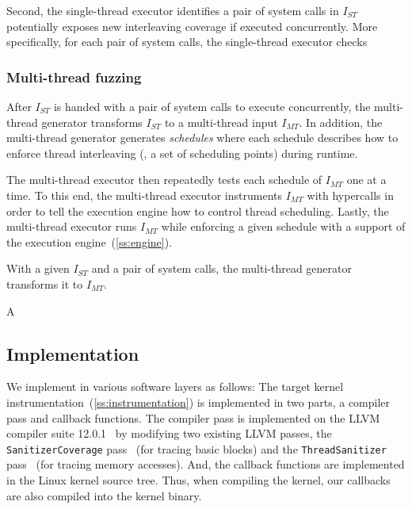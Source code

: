 Second, the single-thread executor identifies a pair of system calls
in $I_{ST}$ potentially exposes new interleaving coverage if executed
concurrently.
%
More specifically, for each pair of system calls, the single-thread
executor checks  \dr{}
%



\subsubsection{Multi-thread fuzzing}
%
After $I_{ST}$ is handed with a pair of system calls to execute
concurrently, the multi-thread generator transforms $I_{ST}$ to a
multi-thread input $I_{MT}$.
%
In addition, the multi-thread generator generates \textit{schedules}
where each schedule describes how to enforce thread interleaving (\ie,
a set of scheduling points) during runtime.


The multi-thread executor then repeatedly tests each schedule of
$I_{MT}$ one at a time.
%
To this end, the multi-thread executor instruments $I_{MT}$ with
hypercalls in order to tell the execution engine how to control thread
scheduling.
%
Lastly, the multi-thread executor runs $I_{MT}$ while enforcing a
given schedule with a support of the execution
engine~(\autoref{ss:engine}).




%





With a given $I_{ST}$ and a pair of system calls, the multi-thread
generator transforms it to $I_{MT}$.




%
A 





\subsection{Implementation}
\label{ss:impl}

We implement \sys in various software layers as follows:
%
The target kernel instrumentation~(\autoref{ss:instrumentation}) is
implemented in two parts, a compiler pass and callback functions. The
compiler pass is implemented on the LLVM compiler suite
12.0.1~\cite{llvm} by modifying two existing LLVM passes, the
\texttt{SanitizerCoverage} pass~\cite{kcovpass} (for tracing basic
blocks) and the \texttt{ThreadSanitizer} pass~\cite{tsanpass} (for
tracing memory accesses).
%
And, the callback functions are implemented in the Linux kernel source
tree.
%
Thus, when compiling the kernel, our callbacks are also compiled into
the kernel binary.


